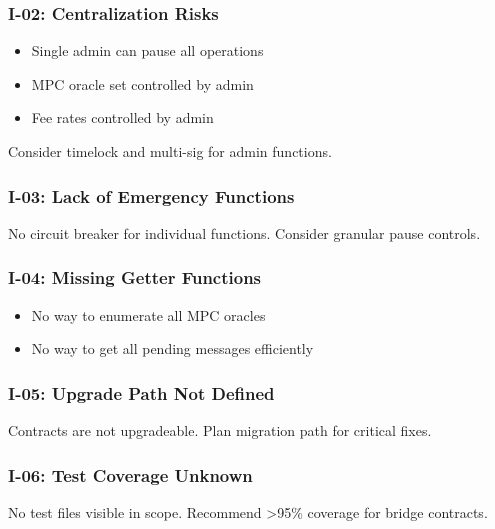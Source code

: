 \documentclass[
]{article}
\providecommand{\tightlist}{%
  \setlength{\itemsep}{0pt}\setlength{\parskip}{0pt}}
\begin{document}
\subsubsection{I-02: Centralization
Risks}\label{i-02-centralization-risks}

\begin{itemize}
\tightlist
\item
  Single admin can pause all operations
\item
  MPC oracle set controlled by admin
\item
  Fee rates controlled by admin
\end{itemize}

Consider timelock and multi-sig for admin functions.

\subsubsection{I-03: Lack of Emergency
Functions}\label{i-03-lack-of-emergency-functions}

No circuit breaker for individual functions. Consider granular pause
controls.

\subsubsection{I-04: Missing Getter
Functions}\label{i-04-missing-getter-functions}

\begin{itemize}
\tightlist
\item
  No way to enumerate all MPC oracles
\item
  No way to get all pending messages efficiently
\end{itemize}

\subsubsection{I-05: Upgrade Path Not
Defined}\label{i-05-upgrade-path-not-defined}

Contracts are not upgradeable. Plan migration path for critical fixes.

\subsubsection{I-06: Test Coverage
Unknown}\label{i-06-test-coverage-unknown}

No test files visible in scope. Recommend \textgreater95\% coverage for
bridge contracts.
\end{document}
